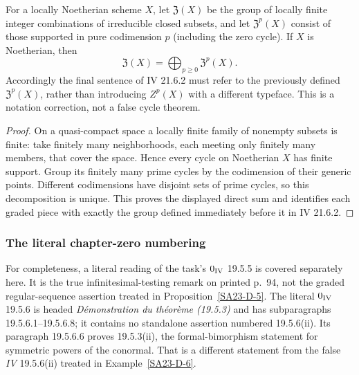 \begin{proposition}\label{SA23-D-16}
For a locally Noetherian scheme $X$, let
$\mathfrak Z(X)$ be the group of locally finite integer
combinations of irreducible closed subsets, and let
$\mathfrak Z^p(X)$ consist of those supported in pure
codimension $p$ (including the zero cycle).
If $X$ is Noetherian, then
\[
 \mathfrak Z(X)=\bigoplus_{p\geq0}\mathfrak Z^p(X).
\]
Accordingly the final sentence of IV 21.6.2 must refer
to the previously defined $\mathfrak Z^p(X)$, rather than
introducing $Z^p(X)$ with a different typeface.
This is a notation correction, not a false cycle theorem.
\end{proposition}
\begin{proof}
On a quasi-compact space a locally finite family of
nonempty subsets is finite: take finitely many
neighborhoods, each meeting only finitely many members,
that cover the space.  Hence every cycle on Noetherian
$X$ has finite support.  Group its finitely many prime
cycles by the codimension of their generic points.
Different codimensions have disjoint sets of prime
cycles, so this decomposition is unique.  This proves
the displayed direct sum and identifies each graded
piece with exactly the group defined immediately
before it in IV 21.6.2.
\end{proof}

\subsubsection{The literal chapter-zero numbering}

For completeness, a literal reading of the task's
$0_{\rm IV}$ 19.5.5 is covered separately here.
It is the true infinitesimal-testing remark on printed p.~94,
not the graded regular-sequence assertion treated in
Proposition~\ref{SA23-D-5}.
The literal $0_{\rm IV}$ 19.5.6 is headed
\emph{D\'emonstration du th\'eor\`eme (19.5.3)} and has
subparagraphs 19.5.6.1--19.5.6.8; it contains no standalone
assertion numbered 19.5.6(ii).
Its paragraph 19.5.6.6 proves 19.5.3(ii), the
formal-bimorphism statement for symmetric powers of the conormal.
That is a different statement from the false
\emph{IV} 19.5.6(ii) treated in Example~\ref{SA23-D-6}.
\cite[$0_{\rm IV}$ 19.5.3--19.5.6, pp.~91--99]{algEGAIV1}

